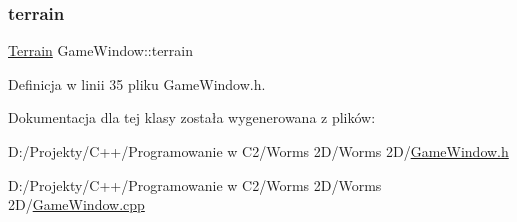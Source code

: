 \subsubsection{\texorpdfstring{terrain}{terrain}}
{\footnotesize\ttfamily \mbox{\hyperlink{class_terrain}{Terrain}} Game\+Window\+::terrain}



Definicja w linii 35 pliku Game\+Window.\+h.



Dokumentacja dla tej klasy została wygenerowana z plików\+:\begin{DoxyCompactItemize}
\item 
D\+:/\+Projekty/\+C++/\+Programowanie w C2/\+Worms 2\+D/\+Worms 2\+D/\mbox{\hyperlink{_game_window_8h}{Game\+Window.\+h}}\item 
D\+:/\+Projekty/\+C++/\+Programowanie w C2/\+Worms 2\+D/\+Worms 2\+D/\mbox{\hyperlink{_game_window_8cpp}{Game\+Window.\+cpp}}\end{DoxyCompactItemize}
